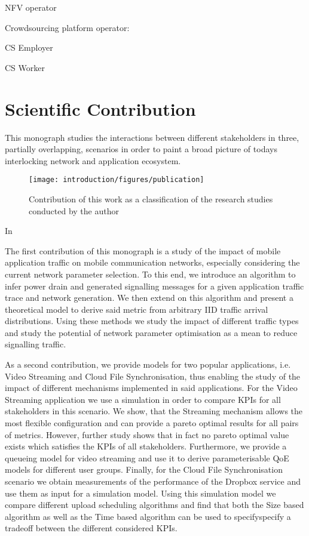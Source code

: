 NFV operator

Crowdsourcing platform operator:

CS Employer

CS Worker

\section{Scientific Contribution}
This monograph studies the interactions between different stakeholders in three, partially overlapping, scenarios in order to paint a broad picture of todays interlocking network and application ecosystem.

\begin{figure}
\centering
\texttt{[image: introduction/figures/publication]}
\caption{Contribution of this work as a classification of the research studies conducted by the author}\label{fig:introduction:publications}
\end{figure}

In 

The first contribution of this monograph is a study of the impact of mobile application traffic on mobile communication networks, especially considering the current network parameter selection.
To this end, we introduce an algorithm to infer power drain and generated signalling messages for a given application traffic trace and network generation.
We then extend on this algorithm and present a theoretical model to derive said metric from arbitrary \gls{IID} traffic arrival distributions.
Using these methods we study the impact of different traffic types and study the potential of network parameter optimisation as a mean to reduce signalling traffic.

As a second contribution, we provide models for two popular applications, i.e. Video Streaming and Cloud File Synchronisation, thus enabling the study of the impact of different mechanisms implemented in said applications.
For the Video Streaming application we use a simulation in order to compare \glspl{KPI} for all stakeholders in this scenario.
We show, that the Streaming mechanism allows the most flexible configuration and can provide a pareto optimal results for all pairs of metrics.
However, further study shows that in fact no pareto optimal value exists which satisfies the \glspl{KPI} of all stakeholders.
Furthermore, we provide a queueing model for video streaming and use it to derive parameterisable \gls{QoE} models for different user groups.
Finally, for the Cloud File Synchronisation scenario we obtain measurements of the performance of the Dropbox service and use them as input for a simulation model.
Using this simulation model we compare different upload scheduling algorithms and find that both the Size based algorithm as well as the Time based algorithm can be used to specifyspecify a tradeoff between the different considered \glspl{KPI}.

